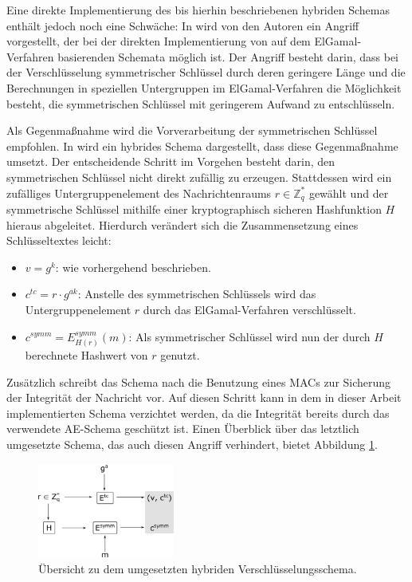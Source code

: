 Eine direkte Implementierung des bis hierhin beschriebenen hybriden Schemas enthält jedoch noch eine Schwäche: In \cite{boneh2000} wird von den Autoren ein Angriff vorgestellt, der bei der direkten Implementierung von auf dem ElGamal-Verfahren basierenden Schemata möglich ist. Der Angriff besteht darin, dass bei der Verschlüsselung symmetrischer Schlüssel durch deren geringere Länge und die Berechnungen in speziellen Untergruppen im ElGamal-Verfahren die Möglichkeit besteht, die symmetrischen Schlüssel mit geringerem Aufwand zu entschlüsseln.

Als Gegenmaßnahme wird die Vorverarbeitung der symmetrischen Schlüssel empfohlen. In \cite{abdalla1999} wird ein hybrides Schema dargestellt, dass diese Gegenmaßnahme umsetzt. Der entscheidende Schritt im Vorgehen besteht darin, den symmetrischen Schlüssel nicht direkt zufällig zu erzeugen. Stattdessen wird ein zufälliges Untergruppenelement des Nachrichtenraums \(r \in \mathbb{Z}_q^*\) gewählt und der symmetrische Schlüssel mithilfe einer kryptographisch sicheren Hashfunktion \(H\) hieraus abgeleitet. Hierdurch verändert sich die Zusammensetzung eines Schlüsseltextes leicht:

\begin{itemize}
  \item \(v = g^k\): wie vorhergehend beschrieben.
  \item \(c^{tc} = r \cdot g^{ak}\): Anstelle des symmetrischen Schlüssels wird das Untergruppenelement \(r\) durch das ElGamal-Verfahren verschlüsselt.
  \item \(c^{symm} = E^{symm}_{H(r)}(m)\): Als symmetrischer Schlüssel wird nun der durch \(H\) berechnete Hash\-wert von \(r\) genutzt.
\end{itemize}

Zusätzlich schreibt das Schema nach \cite{abdalla1999} die Benutzung eines MACs zur Sicherung der Integrität der Nachricht vor. Auf diesen Schritt kann in dem in dieser Arbeit implementierten Schema verzichtet werden, da die Integrität bereits durch das verwendete AE-Schema geschützt ist. Einen Überblick über das letztlich umgesetzte Schema, das auch diesen Angriff verhindert, bietet Abbildung \ref{fig:hybrid_scheme}.

\begin{figure}[]
    \centering
        \includegraphics[width=0.4\textwidth]{dia/hybrid_scheme.pdf}
    \caption{Übersicht zu dem umgesetzten hybriden Verschlüsselungsschema.}
    \label{fig:hybrid_scheme}
\end{figure}

